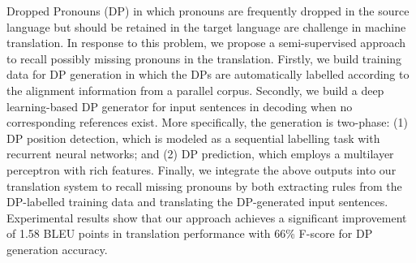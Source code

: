 Dropped Pronouns (DP) in which pronouns are frequently dropped in the source language but should be retained in the target language are challenge in machine translation. In response to this problem, we propose a semi-supervised approach to recall possibly missing pronouns in the translation. Firstly, we build training data for DP generation in which the DPs are automatically labelled according to the alignment information from a parallel corpus. Secondly, we build a deep learning-based DP generator for input sentences in decoding when no corresponding references exist. More specifically, the generation is two-phase: (1) DP position detection, which is modeled as a sequential labelling task with recurrent neural networks; and (2) DP prediction, which employs a multilayer perceptron with rich features. Finally, we integrate the above outputs into our translation system to recall missing pronouns by both extracting rules from the DP-labelled training data and translating the DP-generated input sentences. Experimental results show that our approach achieves a significant improvement of 1.58 BLEU points in translation performance with 66\% F-score for DP generation accuracy.
